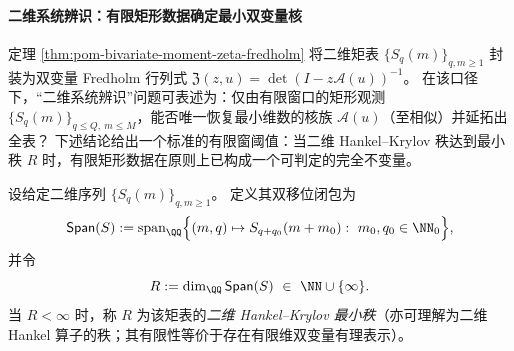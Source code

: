 
\paragraph{二维系统辨识：有限矩形数据确定最小双变量核}
定理 \ref{thm:pom-bivariate-moment-zeta-fredholm} 将二维矩表 \(\{S_q(m)\}_{q,m\ge1}\) 封装为双变量 Fredholm 行列式
\(
\mathfrak{Z}(z,u)=\det(I-z\mathcal{A}(u))^{-1}
\)。
在该口径下，“二维系统辨识”问题可表述为：仅由有限窗口的矩形观测 \(\{S_q(m)\}_{q\le Q,\ m\le M}\)，能否唯一恢复最小维数的核族 \(\mathcal{A}(u)\)（至相似）并延拓出全表？
下述结论给出一个标准的有限窗阈值：当二维 Hankel--Krylov 秩达到最小秩 \(R\) 时，有限矩形数据在原则上已构成一个可判定的完全不变量。

\begin{definition}\label{def:pom-bivariate-hankel-krylov-rank}
设给定二维序列 \(\{S_q(m)\}_{q,m\ge1}\)。
定义其双移位闭包为
\[
\mathsf{Span}(S):=\mathrm{span}_{\QQ}\Bigl\{(m,q)\mapsto S_{q+q_0}(m+m_0):\ m_0,q_0\in\NN_0\Bigr\},
\]
并令
\[
R:=\dim_{\QQ}\mathsf{Span}(S)\ \in\ \NN\cup\{\infty\}.
\]
当 \(R<\infty\) 时，称 \(R\) 为该矩表的\emph{二维 Hankel--Krylov 最小秩}（亦可理解为二维 Hankel 算子的秩；其有限性等价于存在有限维双变量有理表示）。
\end{definition}

